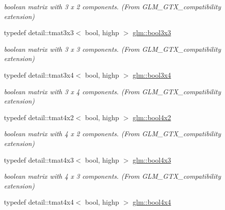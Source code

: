 \begin{DoxyCompactItemize}
\begin{DoxyCompactList}\small\item\em boolean matrix with 3 x 2 components. (From G\+L\+M\+\_\+\+G\+T\+X\+\_\+compatibility extension) \end{DoxyCompactList}\item 
typedef detail\+::tmat3x3$<$ bool, highp $>$ \hyperlink{group__gtx__compatibility_gae9cc5d3d9c72543e303af4d702bf7b40}{glm\+::bool3x3}\hypertarget{group__gtx__compatibility_gae9cc5d3d9c72543e303af4d702bf7b40}{}\label{group__gtx__compatibility_gae9cc5d3d9c72543e303af4d702bf7b40}

\begin{DoxyCompactList}\small\item\em boolean matrix with 3 x 3 components. (From G\+L\+M\+\_\+\+G\+T\+X\+\_\+compatibility extension) \end{DoxyCompactList}\item 
typedef detail\+::tmat3x4$<$ bool, highp $>$ \hyperlink{group__gtx__compatibility_gaf68d62e1c790fa3f09ef5e866af690f1}{glm\+::bool3x4}\hypertarget{group__gtx__compatibility_gaf68d62e1c790fa3f09ef5e866af690f1}{}\label{group__gtx__compatibility_gaf68d62e1c790fa3f09ef5e866af690f1}

\begin{DoxyCompactList}\small\item\em boolean matrix with 3 x 4 components. (From G\+L\+M\+\_\+\+G\+T\+X\+\_\+compatibility extension) \end{DoxyCompactList}\item 
typedef detail\+::tmat4x2$<$ bool, highp $>$ \hyperlink{group__gtx__compatibility_gaa431c2e87e8d78c4780c938a9483d6ff}{glm\+::bool4x2}\hypertarget{group__gtx__compatibility_gaa431c2e87e8d78c4780c938a9483d6ff}{}\label{group__gtx__compatibility_gaa431c2e87e8d78c4780c938a9483d6ff}

\begin{DoxyCompactList}\small\item\em boolean matrix with 4 x 2 components. (From G\+L\+M\+\_\+\+G\+T\+X\+\_\+compatibility extension) \end{DoxyCompactList}\item 
typedef detail\+::tmat4x3$<$ bool, highp $>$ \hyperlink{group__gtx__compatibility_ga7acb207ab877c53dc5751752e1f70053}{glm\+::bool4x3}\hypertarget{group__gtx__compatibility_ga7acb207ab877c53dc5751752e1f70053}{}\label{group__gtx__compatibility_ga7acb207ab877c53dc5751752e1f70053}

\begin{DoxyCompactList}\small\item\em boolean matrix with 4 x 3 components. (From G\+L\+M\+\_\+\+G\+T\+X\+\_\+compatibility extension) \end{DoxyCompactList}\item 
typedef detail\+::tmat4x4$<$ bool, highp $>$ \hyperlink{group__gtx__compatibility_ga4738dad3625bfa64ddf218897da020e9}{glm\+::bool4x4}\hypertarget{group__gtx__compatibility_ga4738dad3625bfa64ddf218897da020e9}{}\label{group__gtx__compatibility_ga4738dad3625bfa64ddf218897da020e9}


\end{DoxyCompactItemize}
